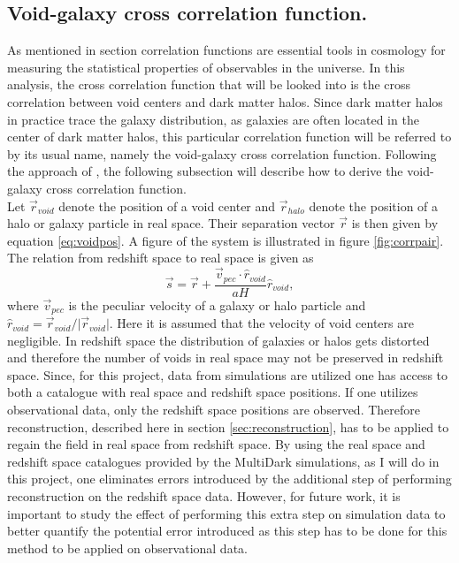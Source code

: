 \subsection{Void-galaxy cross correlation function.}\label{sec:vgcrosscorr}
As mentioned in section  correlation functions are
essential tools in cosmology for measuring the statistical properties of
observables in the universe. In this analysis, the cross correlation function that
will be looked into is the cross correlation between void centers and dark matter halos. Since dark matter halos in practice trace the galaxy distribution, as galaxies are often located in the center of dark matter halos, this particular correlation function will be referred to by its usual name, namely the void-galaxy cross correlation function. Following the approach of \cite{Nadathur_corr}, the following
subsection will describe how to derive the void-galaxy cross correlation
function. 
\\\indent
Let $\vec{r}_{void}$ denote the position of a void center and $\vec{r}_{halo}$ denote the
position of a halo or galaxy particle in real space. Their separation vector $\vec{r}$ is then
given by equation \ref{eq:voidpos}. A figure of the system is illustrated in figure \ref{fig:corrpair}. The relation from redshift space to real space
is given as
\begin{equation}\label{eq:s_to_r}
    \vec{s}=\vec{r}+\frac{\vec{v}_{pec}\cdot\hat{r}_{void}}{aH}\hat{r}_{void},
\end{equation}
where $\vec{v}_{pec}$ is the peculiar velocity of a galaxy or halo particle and
$\hat{r}_{void}=\vec{r}_{void}/ \vert \vec{r}_{void}\vert$. Here it is assumed
that the velocity of void centers are negligible. In redshift space the distribution of galaxies or halos gets distorted and therefore the number of voids in
real space may not be preserved in redshift space. Since, for this project, data from simulations are utilized one has access to both a catalogue with real space and redshift space positions. If one utilizes observational data, only the redshift space positions are observed. Therefore reconstruction,
described here in section \ref{sec:reconstruction}, has to be applied to regain
the field in real space from redshift space. By using the real space and redshift space catalogues provided by the MultiDark simulations\cite{Multidark_dataset}, as I will do in this project, one eliminates errors introduced by the additional step of performing reconstruction on the redshift space data. However, for future work, it is important to study the effect of performing this extra step on simulation data to better quantify the potential error introduced as this step has to be done for this method to be applied on observational data.\\\indent
